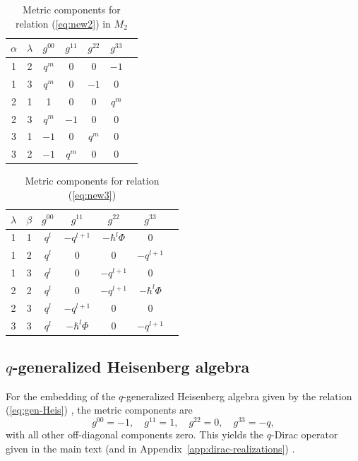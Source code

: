 \documentclass[12pt,a4paper]{article}
\theoremstyle{plain}
\theoremstyle{definition}
\begin{document}
\begin{table}[H]
\centering
\small
\caption{Metric components for relation (\ref{eq:new2}) in $M_2$}
\label{tab:app-new2-m2}
\begin{tabular}{|c|c|c|c|c|c|c|}
\hline
$\alpha$ & $\lambda$ & $g^{00}$ & $g^{11}$ & $g^{22}$ & $g^{33}$ \\
\hline
1 & 2 & $q^{m}$ & 0 & 0 & $-1$ \\
\hline
1 & 3 & $q^{m}$ & 0 & $-1$ & 0 \\
\hline
2 & 1 & 1 & 0 & 0 & $q^{m}$ \\
\hline
2 & 3 & $q^{m}$ & $-1$ & 0 & 0 \\
\hline
3 & 1 & $-1$ & 0 & $q^{m}$ & 0 \\
\hline
3 & 2 & $-1$ & $q^{m}$ & 0 & 0 \\
\hline
\end{tabular}
\end{table}

\begin{table}[H]
\centering
\small
\caption{Metric components for relation (\ref{eq:new3})}
\label{tab:app-new3}
\begin{tabular}{|c|c|c|c|c|c|c|}
\hline
$\lambda$ & $\beta$ & $g^{00}$ & $g^{11}$ & $g^{22}$ & $g^{33}$ \\
\hline
1 & 1 & $q^{l}$ & $-q^{l+1}$ & $-\hbar^{l}\Phi$ & 0 \\
\hline
1 & 2 & $q^{l}$ & 0 & 0 & $-q^{l+1}$ \\
\hline
1 & 3 & $q^{l}$ & 0 & $-q^{l+1}$ & 0 \\
\hline
2 & 2 & $q^{l}$ & 0 & $-q^{l+1}$ & $-\hbar^{l}\Phi$ \\
\hline
2 & 3 & $q^{l}$ & $-q^{l+1}$ & 0 & 0 \\
\hline
3 & 3 & $q^{l}$ & $-\hbar^{l}\Phi$ & 0 & $-q^{l+1}$ \\
\hline
\end{tabular}
\end{table}

\subsection{$q$-generalized Heisenberg algebra}

For the embedding of the $q$-generalized Heisenberg algebra given by the relation (\ref{eq:gen-Heis}) , the metric components are
\[
g^{00}=-1,\quad g^{11}=1,\quad g^{22}=0,\quad g^{33}=-q,
\]
with all other off‑diagonal components zero. This yields the $q$-Dirac operator given in the main text (and in Appendix~\ref{app:dirac-realizations}) \cite{Razavinia-Lopes2022}.
\end{document}
